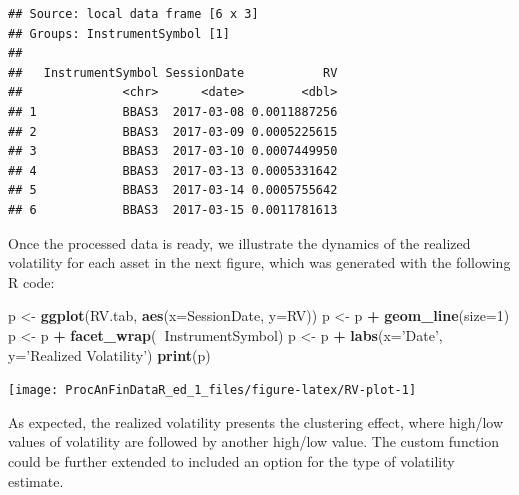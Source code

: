 \documentclass[11pt,]{book}
\newenvironment{Shaded}{\begin{snugshade}}{\end{snugshade}}
\newcommand{\KeywordTok}[1]{\textcolor[rgb]{0.27,0.27,0.27}{\textbf{#1}}}
\newcommand{\DataTypeTok}[1]{\textcolor[rgb]{0.27,0.27,0.27}{#1}}
\newcommand{\DecValTok}[1]{\textcolor[rgb]{0.06,0.06,0.06}{#1}}
\newcommand{\StringTok}[1]{\textcolor[rgb]{0.5,0.5,0.5}{#1}}
\newcommand{\OperatorTok}[1]{\textcolor[rgb]{0.81,0.36,0.00}{\textbf{#1}}}
\newcommand{\NormalTok}[1]{#1}
\begin{document}
\begin{verbatim}
## Source: local data frame [6 x 3]
## Groups: InstrumentSymbol [1]
## 
##   InstrumentSymbol SessionDate           RV
##              <chr>      <date>        <dbl>
## 1            BBAS3  2017-03-08 0.0011887256
## 2            BBAS3  2017-03-09 0.0005225615
## 3            BBAS3  2017-03-10 0.0007449950
## 4            BBAS3  2017-03-13 0.0005331642
## 5            BBAS3  2017-03-14 0.0005755642
## 6            BBAS3  2017-03-15 0.0011781613
\end{verbatim}

Once the processed data is ready, we illustrate the dynamics of the
realized volatility for each asset in the next figure, which was
generated with the following R code:

\begin{Shaded}
\begin{Highlighting}[]
\NormalTok{p <-}\StringTok{ }\KeywordTok{ggplot}\NormalTok{(RV.tab, }\KeywordTok{aes}\NormalTok{(}\DataTypeTok{x=}\NormalTok{SessionDate, }\DataTypeTok{y=}\NormalTok{RV))}
\NormalTok{p <-}\StringTok{ }\NormalTok{p }\OperatorTok{+}\StringTok{ }\KeywordTok{geom_line}\NormalTok{(}\DataTypeTok{size=}\DecValTok{1}\NormalTok{)}
\NormalTok{p <-}\StringTok{ }\NormalTok{p }\OperatorTok{+}\StringTok{ }\KeywordTok{facet_wrap}\NormalTok{(}\OperatorTok{~}\NormalTok{InstrumentSymbol)}
\NormalTok{p <-}\StringTok{ }\NormalTok{p }\OperatorTok{+}\StringTok{ }\KeywordTok{labs}\NormalTok{(}\DataTypeTok{x=}\StringTok{'Date'}\NormalTok{, }\DataTypeTok{y=}\StringTok{'Realized Volatility'}\NormalTok{)}
\KeywordTok{print}\NormalTok{(p)}
\end{Highlighting}
\end{Shaded}

\begin{center}\texttt{[image: ProcAnFinDataR\_ed\_1\_files/figure-latex/RV-plot-1]} \end{center}

As expected, the realized volatility presents the clustering effect,
where high/low values of volatility are followed by another high/low
value. The custom function could be further extended to included an
option for the type of volatility estimate.



\printindex
\end{document}

